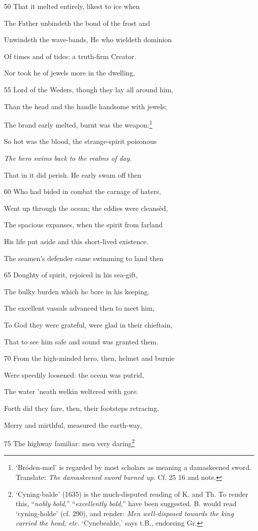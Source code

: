 50
That it melted entirely, likest to ice when

The Father unbindeth the bond of the frost and

Unwindeth the wave-bands, He who wieldeth dominion

Of times and of tides: a truth-firm Creator.

Nor took he of jewels more in the dwelling,

55
Lord of the Weders, though they lay all around him,

Than the head and the handle handsome with jewels;

The brand early melted, burnt was the weapon:\footnote{‘Bróden-mæl’ is regarded by most scholars as meaning a damaskeened
sword. Translate: \emph{The damaskeened sword burned up}. Cf. 25 16 and note.}

So hot was the blood, the strange-spirit poisonous

\emph{The hero swims
back to the realms
of day.}

That in it did perish. He early swam off then

60
Who had bided in combat the carnage of haters,

Went up through the ocean; the eddies were cleansèd,

The spacious expanses, when the spirit from farland

His life put aside and this short-lived existence.

The seamen’s defender came swimming to land then

65
Doughty of spirit, rejoiced in his sea-gift,

The bulky burden which he bore in his keeping.

The excellent vassals advanced then to meet him,

To God they were grateful, were glad in their chieftain,

That to see him safe and sound was granted them.

70
From the high-minded hero, then, helmet and burnie

Were speedily loosened: the ocean was putrid,

The water ’neath welkin weltered with gore.

Forth did they fare, then, their footsteps retracing,

Merry and mirthful, measured the earth-way,

75
The highway familiar: men very daring\footnote{‘Cyning-balde’ (1635) is the much-disputed reading of K. and Th. To
render this, “\emph{nobly bold},” “\emph{excellently bold},” have been suggested. B. would
read ‘cyning-holde’ (cf. 290), and render: \emph{Men well-disposed towards the
king carried the head, etc.} ‘Cynebealde,’ says t.B., endorsing Gr.}

